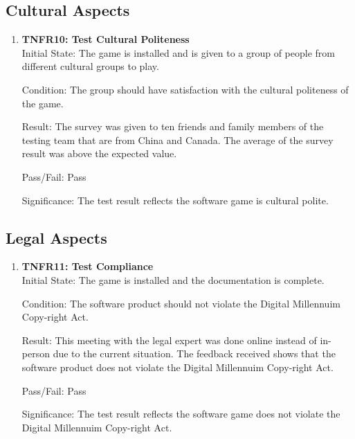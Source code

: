 \documentclass[12pt, titlepage]{article}
\begin{document}
\subsection{Cultural Aspects}
\begin{enumerate}
\item{\textbf{TNFR10: Test Cultural Politeness\\}}
Initial State: The game is installed and is given to a group of people from different cultural groups to play.

Condition: The group should have satisfaction with the cultural politeness of the game.

Result: The survey was given to ten friends and family members of the testing team that are from China and Canada. The average of the survey result was above the expected value.

Pass/Fail: Pass

Significance: The test result reflects the software game is cultural polite.
\end{enumerate}

\subsection{Legal Aspects}
\begin{enumerate}
\item{\textbf{TNFR11: Test Compliance\\}}
Initial State: The game is installed and the documentation is complete.

Condition: The software product should not violate the Digital Millennuim Copy-right Act\cite{act}.

Result: This meeting with the legal expert was done online instead of in-person due to the current situation. The feedback received shows that the software product does not violate the Digital Millennuim Copy-right Act\cite{act}.

Pass/Fail: Pass

Significance: The test result reflects the software game does not violate the Digital Millennuim Copy-right Act\cite{act}.
\end{enumerate}
\end{document}
